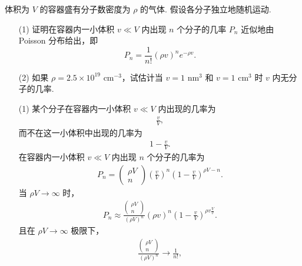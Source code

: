 \documentclass{assignment}
\begin{document}
\begin{prob}
    体积为 $V$ 的容器盛有分子数密度为 $\rho$ 的气体. 假设各分子独立地随机运动.
    \begin{itemize}
        \item[(1)] 证明在容器内一小体积 $v\ll V$ 内出现 $n$ 个分子的几率 $P_n$ 近似地由 Poisson 分布给出，即
        \[
            P_n=\frac{1}{n!}(\rho v)^ne^{-\rho v}.
        \]
        \item[(2)] 如果 $\rho=2.5\times 10^{19}\text{ cm}^{-3}$，试估计当 $v=1\text{ nm}^3$ 和 $v=1\text{ cm}^3$ 时 $v$ 内无分子的几率.
    \end{itemize}
\end{prob}
\begin{sol}
    \begin{itemize}
        \item[(1)] 某个分子在容器内一小体积 $v\ll V$ 内出现的几率为
        \begin{align}
            \frac{v}{V},
        \end{align}
        而不在这一小体积中出现的几率为
        \begin{align}
            1-\frac{v}{V}.
        \end{align}
        在容器内一小体积 $v\ll V$ 内出现 $n$ 个分子的几率为
        \begin{align}
            P_n=\left(\begin{matrix}
                \rho V\\
                n
            \end{matrix}\right)\left(\frac{v}{V}\right)^n\left(1-\frac{v}{V}\right)^{\rho V-n}.
        \end{align}
        当 $\rho V\rightarrow\infty$ 时，
        \begin{align}
            P_n\approx\frac{\left(\begin{matrix}
                \rho V\\
                n
            \end{matrix}\right)}{(\rho V)^n}\left(\rho v\right)^n\left(1-\frac{v}{V}\right)^{\rho v\frac{V}{v}}.
        \end{align}
        且在 $\rho V\rightarrow\infty$ 极限下，
        \begin{align}
            \frac{\left(\begin{matrix}
                \rho V\\
                n
            \end{matrix}\right)}{(\rho V)^n}\rightarrow\frac{1}{n!},

\end{align}
\end{itemize}
\end{sol}
\end{document}
